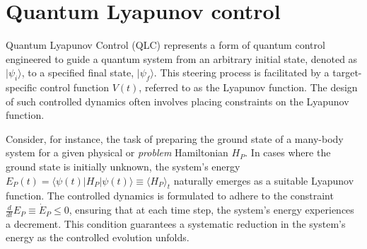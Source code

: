 \documentclass[twocolumn,aps,superscriptaddress,floatfix,longbibliography]{revtex4-2}
\begin{document}
\section{Quantum Lyapunov control}
\label{sec:QLC}

Quantum Lyapunov Control (QLC) represents a form of quantum
control engineered to guide a quantum system from an arbitrary
initial state, denoted as $\vert \psi_i \rangle$, to a specified
final state, $\vert \psi_f \rangle$. This steering process is
facilitated by a target-specific control function $V(t)$,
referred to as the Lyapunov function. The design of such
controlled dynamics often involves placing constraints on the
Lyapunov function.

Consider, for instance, the task of preparing the ground state
of a many-body system for a given  %
physical or {\it problem} Hamiltonian $H_P$.
In cases where
the ground state is initially unknown, the system's energy
$E_P(t) = \langle \psi(t) \vert H_P \vert \psi(t) \rangle
\equiv \langle H_P \rangle_t$
naturally emerges as a suitable Lyapunov function. The
controlled dynamics is formulated to adhere to the constraint
$\frac{d}{dt}E_P \equiv \dot{E}_P \leq 0$, 
ensuring that at each time step, the system's
energy experiences a decrement. This condition guarantees a
systematic reduction in the system's energy as the controlled
evolution unfolds.
\end{document}
